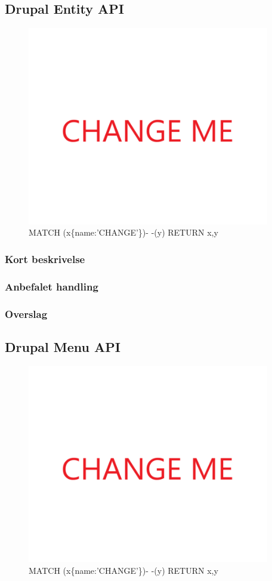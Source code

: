 \documentclass{article}
\begin{document}
\subsection{Drupal Entity API}
\begin{figure}[h]
\includegraphics[width=300pt]{CHANGE.PNG}
\caption{MATCH (x\{name:'CHANGE'\})- -(y) RETURN x,y}
\end{figure}
\subsubsection{Kort beskrivelse}
\subsubsection{Anbefalet handling}
\subsubsection{Overslag}
\newpage{}
\clearpage
\subsection{Drupal Menu API}
\begin{figure}[h]
\includegraphics[width=300pt]{CHANGE.PNG}
\caption{MATCH (x\{name:'CHANGE'\})- -(y) RETURN x,y}
\end{figure}
\end{document}
